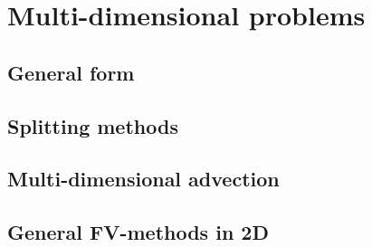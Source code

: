\section{Multi-dimensional problems}


\subsection{General form}


\subsection{Splitting methods}


\subsection{Multi-dimensional advection}


\subsection{General FV-methods in 2D}